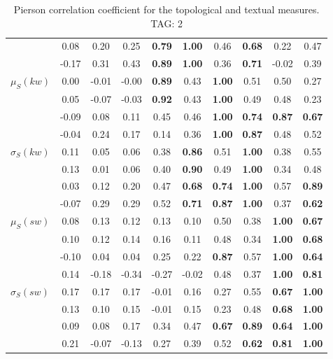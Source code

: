 \begin{table*}[h!]
\begin{center}
\begin{tabular}{| l || c | c | c | c | c | c | c | c | c |}
 & 0.08 & 0.20 & 0.25 & {\bf 0.79} & {\bf 1.00} & 0.46 & {\bf 0.68} & 0.22 & 0.47 \\
 & -0.17 & 0.31 & 0.43 & {\bf 0.89} & {\bf 1.00} & 0.36 & {\bf 0.71} & -0.02 & 0.39 \\\hline
$\mu_S(kw)$ & 0.00 & -0.01 & -0.00 & {\bf 0.89} & 0.43 & {\bf 1.00} & 0.51 & 0.50 & 0.27 \\
 & 0.05 & -0.07 & -0.03 & {\bf 0.92} & 0.43 & {\bf 1.00} & 0.49 & 0.48 & 0.23 \\
 & -0.09 & 0.08 & 0.11 & 0.45 & 0.46 & {\bf 1.00} & {\bf 0.74} & {\bf 0.87} & {\bf 0.67} \\
 & -0.04 & 0.24 & 0.17 & 0.14 & 0.36 & {\bf 1.00} & {\bf 0.87} & 0.48 & 0.52 \\\hline
$\sigma_S(kw)$ & 0.11 & 0.05 & 0.06 & 0.38 & {\bf 0.86} & 0.51 & {\bf 1.00} & 0.38 & 0.55 \\
 & 0.13 & 0.01 & 0.06 & 0.40 & {\bf 0.90} & 0.49 & {\bf 1.00} & 0.34 & 0.48 \\
 & 0.03 & 0.12 & 0.20 & 0.47 & {\bf 0.68} & {\bf 0.74} & {\bf 1.00} & 0.57 & {\bf 0.89} \\
 & -0.07 & 0.29 & 0.29 & 0.52 & {\bf 0.71} & {\bf 0.87} & {\bf 1.00} & 0.37 & {\bf 0.62} \\\hline
$\mu_S(sw)$ & 0.08 & 0.13 & 0.12 & 0.13 & 0.10 & 0.50 & 0.38 & {\bf 1.00} & {\bf 0.67} \\
 & 0.10 & 0.12 & 0.14 & 0.16 & 0.11 & 0.48 & 0.34 & {\bf 1.00} & {\bf 0.68} \\
 & -0.10 & 0.04 & 0.04 & 0.25 & 0.22 & {\bf 0.87} & 0.57 & {\bf 1.00} & {\bf 0.64} \\
 & 0.14 & -0.18 & -0.34 & -0.27 & -0.02 & 0.48 & 0.37 & {\bf 1.00} & {\bf 0.81} \\\hline
$\sigma_S(sw)$ & 0.17 & 0.17 & 0.17 & -0.01 & 0.16 & 0.27 & 0.55 & {\bf 0.67} & {\bf 1.00} \\
 & 0.13 & 0.10 & 0.15 & -0.01 & 0.15 & 0.23 & 0.48 & {\bf 0.68} & {\bf 1.00} \\
 & 0.09 & 0.08 & 0.17 & 0.34 & 0.47 & {\bf 0.67} & {\bf 0.89} & {\bf 0.64} & {\bf 1.00} \\
 & 0.21 & -0.07 & -0.13 & 0.27 & 0.39 & 0.52 & {\bf 0.62} & {\bf 0.81} & {\bf 1.00} \\\hline
\end{tabular}
\caption{Pierson correlation coefficient for the topological and textual measures. TAG: 2}
\end{center}
\end{table*}